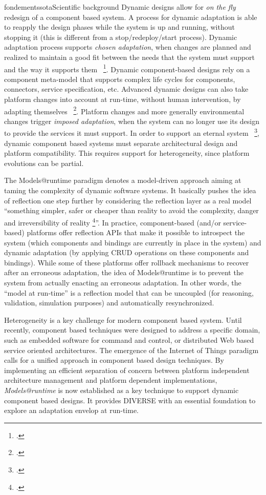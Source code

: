 \documentclass{ra2018}
\newcommand{\team}{DIVERSE}
\begin{document}
\begin{module}{fondements}{sota}{Scientific background}
Dynamic designs allow for \textit{on the fly} redesign of a component based system. 
A  process for dynamic adaptation is able to reapply the  design phases while the system is up and running, without stopping it (this is different from a stop/redeploy/start process).
Dynamic adaptation process supports \textit{chosen adaptation}, when changes are planned and realized to maintain a good fit between the needs that the system must support and the way it supports them~  \footcite{Kramer:2007kv}.
Dynamic component-based designs rely on a component meta-model that supports complex life cycles for components, connectors, service specification, etc.
Advanced dynamic designs can also take platform changes into account at run-time, without human intervention, by adapting themselves~  \footcite{Cheng:2009hh,Vromant:NPd9bKZ}.
Platform changes and more generally environmental changes trigger \textit{imposed adaptation}, when the system can no longer use its design to provide the services it must support.
In order to support an eternal system~  \footcite{Bencomo:2009tm}, dynamic component based systems must separate architectural design and platform compatibility.
This requires  support for heterogeneity, since platform evolutions can be partial.

The Models@runtime paradigm denotes a model-driven approach aiming at taming the complexity of dynamic software systems. It basically pushes the idea of reflection one step further by considering the reflection layer as a real model ``something simpler, safer or cheaper than reality to avoid the complexity, danger and irreversibility of reality  \footcite{Rothenberg89thenature}''. In practice, component-based (and/or service-based) platforms offer reflection APIs that make it possible to introspect the system (which components and bindings are currently in place in the system) and dynamic adaptation (by applying CRUD operations on these components and bindings). While some of these platforms offer rollback mechanisms to recover after an erroneous adaptation, the idea of Models@runtime is to prevent the system from actually enacting an erroneous adaptation. In other words, the ``model at run-time'' is a reflection model that can be uncoupled (for reasoning, validation, simulation purposes) and automatically resynchronized.



Heterogeneity is a key challenge for modern component based system. 
Until recently, component based techniques were designed to address a specific domain, such as embedded software for command and control, or distributed Web based service oriented architectures.
The emergence of the Internet of Things paradigm calls for a unified approach in component based design techniques.
By implementing an efficient separation of concern between platform independent architecture management and platform dependent implementations,
\textit{Models@runtime}  is now established as a key technique to support dynamic  component based designs. It provides \team{} with an essential foundation to explore an adaptation envelop at run-time. 


\end{module}
\end{document}
